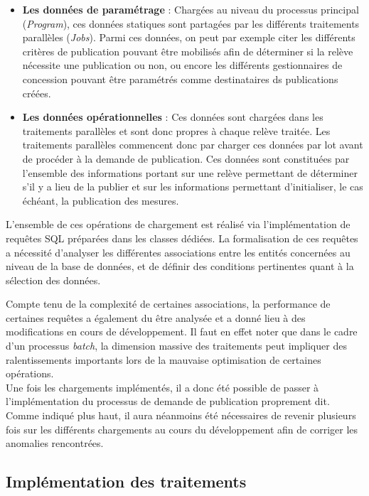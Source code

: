 \documentclass[a4paper, 12pt]{report}
\begin{document}
\begin{itemize}
  \item \textbf{Les données de paramétrage} : Chargées au niveau du processus principal (\textit{Program}), ces données statiques sont partagées par les différents traitements parallèles (\textit{Jobs}). Parmi ces données, on peut par exemple citer les différents critères de publication pouvant être mobilisés afin de déterminer si la relève nécessite une publication ou non, ou encore les différents gestionnaires de concession pouvant être paramétrés comme destinataires ds publications créées.
  \item \textbf{Les données opérationnelles} : Ces données sont chargées dans les traitements parallèles et sont donc propres à chaque relève traitée. Les traitements parallèles commencent donc par charger ces données par lot avant de procéder à la demande de publication. Ces données sont constituées par l'ensemble des informations portant sur une relève permettant de déterminer s'il y a lieu de la publier et sur les informations permettant d'initialiser, le cas échéant, la publication des mesures.
\end{itemize}
\vspace{0.5cm}

L'ensemble de ces opérations de chargement est réalisé via l'implémentation de requêtes SQL préparées dans les classes dédiées. La formalisation de ces requêtes a nécessité d'analyser les différentes associations entre les entités concernées au niveau de la base de données, et de définir des conditions pertinentes quant à la sélection des données.

Compte tenu de la complexité de certaines associations, la performance de certaines requêtes a également du être analysée et a donné lieu à des modifications en cours de développement. Il faut en effet noter que dans le cadre d'un processus \textit{batch}, la dimension massive des traitements peut impliquer des ralentissements importants lors de la mauvaise optimisation de certaines opérations.\\

Une fois les chargements implémentés, il a donc été possible de passer à l'implémentation du processus de demande de publication proprement dit. Comme indiqué plus haut, il aura néanmoins été nécessaires de revenir plusieurs fois sur les différents chargements au cours du développement afin de corriger les anomalies rencontrées.

\subsection{Implémentation des traitements}
\end{document}
